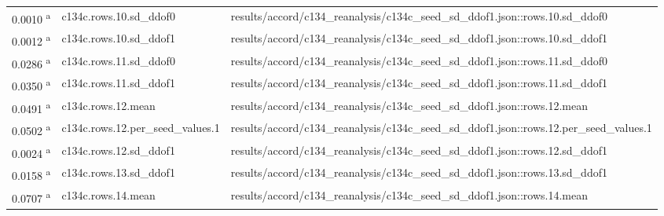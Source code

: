 \begin{longtable}{@{}p{0.7in}p{1.9in}p{2.6in}@{}}
0.0010 \textsuperscript{a} & c134c.\allowbreak{}rows.\allowbreak{}10.\allowbreak{}sd\_ddof0 & results/\allowbreak{}accord/\allowbreak{}c134\_reanalysis/\allowbreak{}c134c\_seed\_sd\_ddof1.\allowbreak{}json::rows.\allowbreak{}10.\allowbreak{}sd\_ddof0\\
0.0012 \textsuperscript{a} & c134c.\allowbreak{}rows.\allowbreak{}10.\allowbreak{}sd\_ddof1 & results/\allowbreak{}accord/\allowbreak{}c134\_reanalysis/\allowbreak{}c134c\_seed\_sd\_ddof1.\allowbreak{}json::rows.\allowbreak{}10.\allowbreak{}sd\_ddof1\\
0.0286 \textsuperscript{a} & c134c.\allowbreak{}rows.\allowbreak{}11.\allowbreak{}sd\_ddof0 & results/\allowbreak{}accord/\allowbreak{}c134\_reanalysis/\allowbreak{}c134c\_seed\_sd\_ddof1.\allowbreak{}json::rows.\allowbreak{}11.\allowbreak{}sd\_ddof0\\
0.0350 \textsuperscript{a} & c134c.\allowbreak{}rows.\allowbreak{}11.\allowbreak{}sd\_ddof1 & results/\allowbreak{}accord/\allowbreak{}c134\_reanalysis/\allowbreak{}c134c\_seed\_sd\_ddof1.\allowbreak{}json::rows.\allowbreak{}11.\allowbreak{}sd\_ddof1\\
0.0491 \textsuperscript{a} & c134c.\allowbreak{}rows.\allowbreak{}12.\allowbreak{}mean & results/\allowbreak{}accord/\allowbreak{}c134\_reanalysis/\allowbreak{}c134c\_seed\_sd\_ddof1.\allowbreak{}json::rows.\allowbreak{}12.\allowbreak{}mean\\
0.0502 \textsuperscript{a} & c134c.\allowbreak{}rows.\allowbreak{}12.\allowbreak{}per\_seed\_values.\allowbreak{}1 & results/\allowbreak{}accord/\allowbreak{}c134\_reanalysis/\allowbreak{}c134c\_seed\_sd\_ddof1.\allowbreak{}json::rows.\allowbreak{}12.\allowbreak{}per\_seed\_values.\allowbreak{}1\\
0.0024 \textsuperscript{a} & c134c.\allowbreak{}rows.\allowbreak{}12.\allowbreak{}sd\_ddof1 & results/\allowbreak{}accord/\allowbreak{}c134\_reanalysis/\allowbreak{}c134c\_seed\_sd\_ddof1.\allowbreak{}json::rows.\allowbreak{}12.\allowbreak{}sd\_ddof1\\
0.0158 \textsuperscript{a} & c134c.\allowbreak{}rows.\allowbreak{}13.\allowbreak{}sd\_ddof1 & results/\allowbreak{}accord/\allowbreak{}c134\_reanalysis/\allowbreak{}c134c\_seed\_sd\_ddof1.\allowbreak{}json::rows.\allowbreak{}13.\allowbreak{}sd\_ddof1\\
0.0707 \textsuperscript{a} & c134c.\allowbreak{}rows.\allowbreak{}14.\allowbreak{}mean & results/\allowbreak{}accord/\allowbreak{}c134\_reanalysis/\allowbreak{}c134c\_seed\_sd\_ddof1.\allowbreak{}json::rows.\allowbreak{}14.\allowbreak{}mean\\

\end{longtable}
